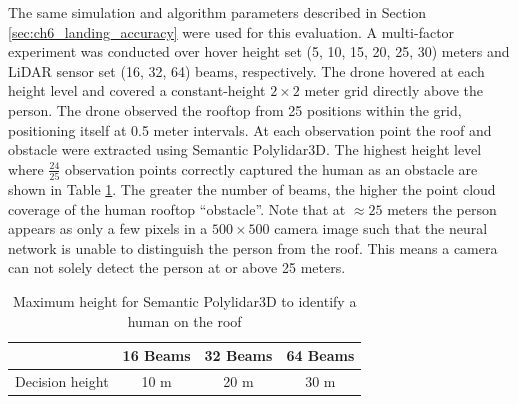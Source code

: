 The same simulation and algorithm parameters described in Section \ref{sec:ch6_landing_accuracy} were used for this evaluation. A multi-factor experiment was conducted over hover height set (5, 10, 15, 20, 25, 30) meters and LiDAR sensor set (16, 32, 64) beams, respectively. The drone hovered at each height level and covered a constant-height $2\times2$ meter grid directly above the person. The drone observed the rooftop from 25 positions within the grid, positioning itself at 0.5 meter intervals. At each observation point the roof and obstacle were extracted using Semantic Polylidar3D. The highest height level where $\frac{24}{25}$ observation points correctly captured the human as an obstacle are shown in Table \ref{table:decision_height}. The greater the number of beams, the higher the point cloud coverage of the human rooftop ``obstacle''. Note that at $\approx 25$ meters the person appears as only a few pixels in a $500\times500$ camera image such that the neural network is unable to distinguish the person from the roof. This means a camera can not solely detect the person at or above 25 meters.

\begin{table}[!ht]
\centering
\caption{Maximum height for Semantic Polylidar3D to identify a human on the roof} \label{table:decision_height}
\begin{tabular}{@{}cccc@{}}
\toprule
                & 16 Beams & 32 Beams & 64 Beams \\ \midrule
Decision height & 10 m     & 20 m     & 30 m     \\ \bottomrule
\end{tabular}
\end{table}

